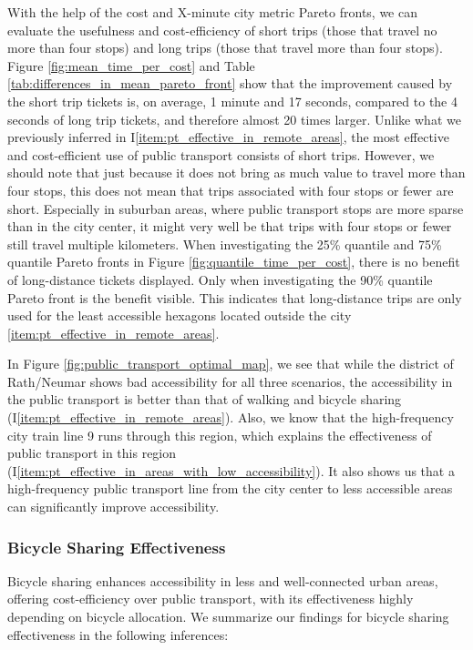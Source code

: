 With the help of the cost and X-minute city metric Pareto fronts, we can evaluate the usefulness and cost-efficiency of short trips (those that travel no more than four stops) and long trips (those that travel more than four stops).
Figure \ref{fig:mean_time_per_cost} and Table \ref{tab:differences_in_mean_pareto_front} show that the improvement caused by the short trip tickets is, on average, 1 minute and 17 seconds, compared to the 4 seconds of long trip tickets, and therefore almost 20 times larger.
Unlike what we previously inferred in I\ref{item:pt_effective_in_remote_areas}, the most effective and cost-efficient use of public transport consists of short trips.
However, we should note that just because it does not bring as much value to travel more than four stops, this does not mean that trips associated with four stops or fewer are short.
Especially in suburban areas, where public transport stops are more sparse than in the city center, it might very well be that trips with four stops or fewer still travel multiple kilometers.
When investigating the 25\% quantile and 75\% quantile Pareto fronts in Figure \ref{fig:quantile_time_per_cost}, there is no benefit of long-distance tickets displayed.
Only when investigating the 90\% quantile Pareto front is the benefit visible.
This indicates that long-distance trips are only used for the least accessible hexagons located outside the city \ref{item:pt_effective_in_remote_areas}.

In Figure \ref{fig:public_transport_optimal_map}, we see that while the district of Rath/Neumar shows bad accessibility for all three scenarios, the accessibility in the public transport is better than that of walking and bicycle sharing (I\ref{item:pt_effective_in_remote_areas}).
Also, we know that the high-frequency city train line 9 runs through this region, which explains the effectiveness of public transport in this region (I\ref{item:pt_effective_in_areas_with_low_accessibility}).
It also shows us that a high-frequency public transport line from the city center to less accessible areas can significantly improve accessibility.

\subsubsection{Bicycle Sharing Effectiveness}
Bicycle sharing enhances accessibility in less and well-connected urban areas, offering cost-efficiency over public transport, with its effectiveness highly depending on bicycle allocation.
We summarize our findings for bicycle sharing effectiveness in the following inferences:


